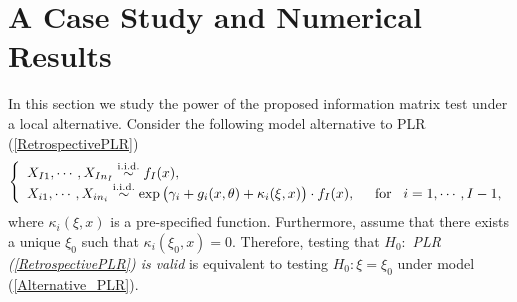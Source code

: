 \documentclass[11pt]{article}
\theoremstyle{plain}
\theoremstyle{definition}
\theoremstyle{remark}
\theoremstyle{definition}
\begin{document}
\section{A Case Study and Numerical Results}\label{sec5}
In this section we study the power of the proposed information matrix test under a local alternative. Consider the following model alternative to PLR (\ref{RetrospectivePLR})
\begin{equation}
\left\{ \begin{array}{llll}
$$X_{I1}, \cdots, X_{In_I} \stackrel{\mathrm{ i.i.d.}}{\sim}f_{I}(x),\hspace{1.in}$$\\
$$X_{i1}, \cdots, X_{in_i} \stackrel{\mathrm{ i.i.d.}}
  {\sim} \exp\big(\gamma_i+g_i(x,\theta)+\kappa_i(\xi, x)\big)\cdot f_I(x),
  \hspace{5mm}\mbox{for}\hspace{3mm} i = 1, \cdots, I-1,$$
\end{array}\right.
\label{Alternative_PLR}
\end{equation}
where $\kappa_i(\xi, x)$ is a pre-specified function. Furthermore, assume that there exists a unique $\xi_0$ such that $\kappa_i(\xi_0, x)=0$. Therefore, testing that $H_0:$ {\em PLR (\ref{RetrospectivePLR}) is valid} is equivalent to testing $H_0: \xi=\xi_0$ under model (\ref{Alternative_PLR}).
\end{document}
